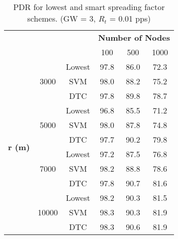 \begin{table}[h]
\centering
\caption{PDR for lowest and smart spreading factor schemes. (GW = 3, ${R_{t}}$ = 0.01 pps)}
\label{table:prediction_pdr}
\begin{tabular}{|c|c|c|c|c|c|}
\hline
\multicolumn{3}{|c|}{\multirow{2}{*}{}}                            & \multicolumn{3}{c|}{\textbf{Number of Nodes}} \\ \cline{4-6}
\multicolumn{3}{|c|}{}                                             & 100           & 500           & 1000          \\ \hline
\multirow{12}{*}{\textbf{r (m)}} & \multirow{3}{*}{3000}  & Lowest & 97.8          & 86.0          & 72.3          \\ \cline{3-6}
                                 &                        & SVM    & 98.0          & 88.2          & 75.2          \\ \cline{3-6}
                                 &                        & DTC    & 97.8          & 89.8          & 78.7          \\ \cline{2-6}

                                 & \multirow{3}{*}{5000}  & Lowest & 96.8          & 85.5          & 71.2          \\ \cline{3-6}
                                 &                        & SVM    & 98.0          & 87.8          & 74.8          \\ \cline{3-6}
                                 &                        & DTC    & 97.7          & 90.2          & 79.8          \\ \cline{2-6}

                                 & \multirow{3}{*}{7000}  & Lowest & 97.2          & 87.5          & 76.8          \\ \cline{3-6}
                                 &                        & SVM    & 98.2          & 88.8          & 78.6          \\ \cline{3-6}
                                 &                        & DTC    & 97.8          & 90.7          & 81.6          \\ \cline{2-6}

                                 & \multirow{3}{*}{10000} & Lowest & 98.2          & 90.3          & 81.5          \\ \cline{3-6}
                                 &                        & SVM    & 98.3          & 90.3          & 81.9          \\ \cline{3-6}
                                 &                        & DTC    & 98.3          & 90.6          & 81.9          \\ \hline
\end{tabular}
\end{table}

